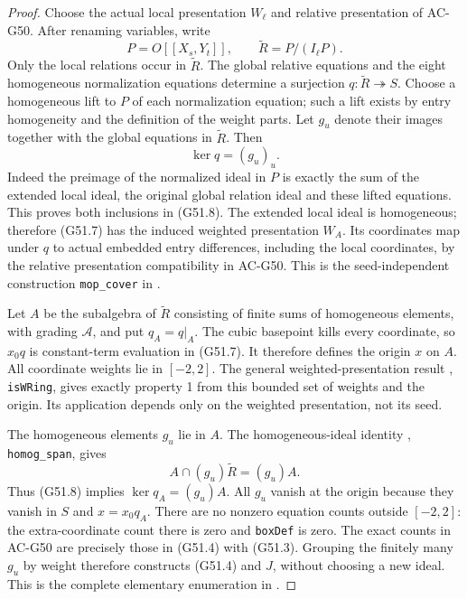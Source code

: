 \begin{proof}
Choose the actual local presentation $W_\ell$ and
relative presentation of AC-G50.  After renaming variables,
write
\[
 P=O[[X_s,Y_t]],\qquad
 \widetilde R=P/(I_\ell P).
                                                               \tag{G51.7}
\]
Only the local relations occur in $\widetilde R$.
The global relative equations and the eight homogeneous
normalization equations determine a surjection
$q:\widetilde R\twoheadrightarrow S$.
Choose a homogeneous lift to $P$ of each normalization
equation; such a lift exists by entry homogeneity and
the definition of the weight parts.  Let $g_u$ denote
their images together with the global equations in
$\widetilde R$.  Then
\[
                         \ker q=(g_u)_u.                     \tag{G51.8}
\]
Indeed the preimage of the normalized ideal in $P$ is
exactly the sum of the extended local ideal, the original
global relation ideal and these lifted equations.  This
proves both inclusions in (G51.8).
The extended local ideal is homogeneous; therefore
(G51.7) has the induced weighted presentation $W_A$.
Its coordinates map under $q$ to actual embedded entry
differences, including the local coordinates, by the
relative presentation compatibility in AC-G50.
This is the seed-independent construction
\texttt{mop\_cover} in
.

Let $A$ be the subalgebra of $\widetilde R$ consisting
of finite sums of homogeneous elements, with grading
$\mathcal A$, and put $q_A=q|_A$.
The cubic basepoint kills every coordinate, so
$x_0q$ is constant-term evaluation in (G51.7).
It therefore defines the origin $x$ on $A$.
All coordinate weights lie in $[-2,2]$.
The general weighted-presentation result
,
\texttt{isWRing}, gives exactly property 1 from this
bounded set of weights and the origin.  Its application
depends only on the weighted presentation, not its seed.

The homogeneous elements $g_u$ lie in $A$.
The homogeneous-ideal identity
,
\texttt{homog\_span}, gives
\[
                  A\cap(g_u)\widetilde R=(g_u)A.
                                                               \tag{G51.9}
\]
Thus (G51.8) implies $\ker q_A=(g_u)A$.
All $g_u$ vanish at the origin because they vanish in
$S$ and $x=x_0q_A$.
There are no nonzero equation counts outside $[-2,2]$:
the extra-coordinate count there is zero and
\texttt{boxDef} is zero.  The exact counts in AC-G50
are precisely those in (G51.4) with (G51.3).
Grouping the finitely many $g_u$ by weight therefore
constructs (G51.4) and $J$, without choosing a new ideal.
This is the complete elementary enumeration in
.


\end{proof}
